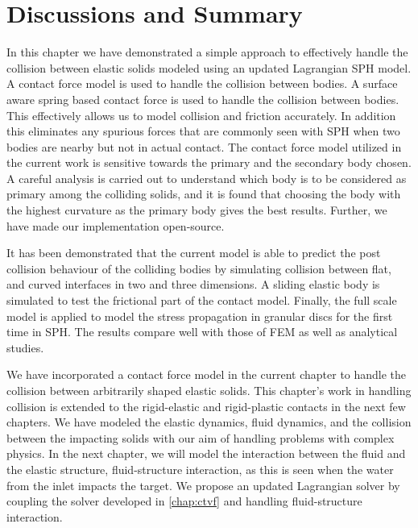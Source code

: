 \FloatBarrier%
\section{Discussions and Summary}

In this chapter we have demonstrated a simple approach to effectively handle the
collision between elastic solids modeled using an updated Lagrangian SPH
model. A contact force model is used to handle the collision between bodies. A
surface aware spring based contact force is used to handle the collision
between bodies. This effectively allows us to model collision and friction
accurately. In addition this eliminates any spurious forces that are commonly
seen with SPH when two bodies are nearby but not in actual contact. The
contact force model utilized in the current work is sensitive towards the
primary and the secondary body chosen. A careful analysis is carried out to
understand which body is to be considered as primary among the colliding
solids, and it is found that choosing the body with the highest curvature as
the primary body gives the best results. Further, we have made our
implementation open-source.

It has been demonstrated that the current model is able to predict the post
collision behaviour of the colliding bodies by simulating collision between
flat, and curved interfaces in two and three dimensions. A sliding elastic
body is simulated to test the frictional part of the contact model. Finally,
the full scale model is applied to model the stress propagation in granular
discs for the first time in SPH. The results compare well with those of FEM as
well as analytical studies.


We have incorporated a contact force model in the current chapter to handle the
collision between arbitrarily shaped elastic solids. This chapter's work in
handling collision is extended to the rigid-elastic and rigid-plastic contacts
in the next few chapters. We have modeled the elastic dynamics, fluid dynamics,
and the collision between the impacting solids with our aim of handling problems
with complex physics. In the next chapter, we will model the interaction between
the fluid and the elastic structure, fluid-structure interaction, as this is
seen when the water from the inlet impacts the target. We propose an updated
Lagrangian solver by coupling the solver developed in \cref{chap:ctvf} and
handling fluid-structure interaction.
